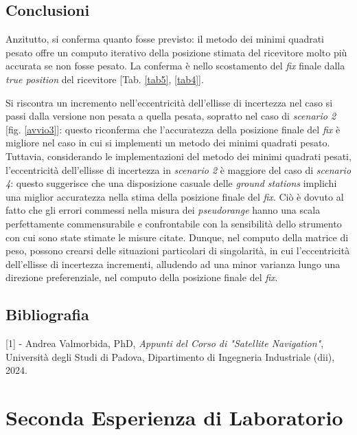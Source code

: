 \documentclass[a4paper,11pt,twoside]{book}
\begin{document}
	\vspace{-0.7cm}
	
	\section{Conclusioni}
	
	Anzitutto, si conferma quanto fosse previsto: il metodo dei minimi quadrati pesato offre un computo iterativo della posizione stimata del ricevitore molto più accurata se non fosse pesato. La conferma è nello scostamento del \textit{fix} finale dalla \textit{true position} del ricevitore [Tab. \ref{tab5}, \ref{tab4}].
	
	Si riscontra un incremento nell'eccentricità dell'ellisse di incertezza nel caso si passi dalla versione non pesata a quella pesata, sopratto nel caso di \textsl{scenario 2} [fig. \ref{avvio3}]: questo riconferma che l'accuratezza della posizione finale del \textit{fix} è migliore nel caso in cui si implementi un metodo dei minimi quadrati pesato. Tuttavia, considerando le implementazioni del metodo dei minimi quadrati pesati, l'eccentricità dell'ellisse di incertezza in \textsl{scenario 2} è maggiore del caso di \textsl{scenario 4}: questo suggerisce che una disposizione casuale delle \textit{ground stations} implichi una miglior accuratezza nella stima della posizione finale del \textit{fix}. Ciò è dovuto al fatto che gli errori commessi nella misura dei \textit{pseudorange} hanno una scala perfettamente commensurabile e confrontabile con la sensibilità dello strumento con cui sono state stimate le misure citate. Dunque, nel computo della matrice di peso, possono crearsi delle situazioni particolari di singolarità, in cui l'eccentricità dell'ellisse di incertezza incrementi, alludendo ad una minor varianza lungo una direzione preferenziale, nel computo della posizione finale del \textit{fix}.
	
	\section{Bibliografia}
	
	[1] - Andrea Valmorbida, PhD, \textit{Appunti del Corso di "Satellite Navigation"}, Università degli Studi di Padova, Dipartimento di Ingegneria Industriale (dii), 2024.
	
	\chapter{Seconda Esperienza di Laboratorio}
	
\end{document}
